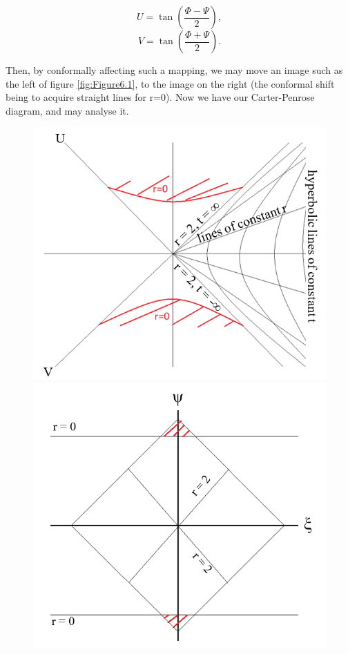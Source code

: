 \documentclass[oneside,openright,frontopenright, singlespacing]{dmathesis}
\begin{document}
	\[U = \tan\left(\frac{\Phi-\Psi}{2}\right),\]
	\[V = \tan\left(\frac{\Phi+\Psi}{2}\right).\]

\vspace{1em}
	Then, by conformally affecting such a mapping, we may move an image such as the left of figure \ref{fig:Figure6.1}, to the image on the right (the conformal shift being to acquire straight lines for r=0). Now we have our Carter-Penrose diagram, and may analyse it.

\vspace{1em}
\begin{figure}[!ht]
	\centering
	\begin{minipage}{0.5\textwidth}
		\centering
		\includegraphics[width=0.9\linewidth]{img/carter-penrose1}
	\end{minipage}%
	\hfill
	\begin{minipage}{0.5\textwidth}
		\centering
		\includegraphics[width=0.9\linewidth]{img/carter-penrose2}

\end{minipage}
\end{figure}
\end{document}
